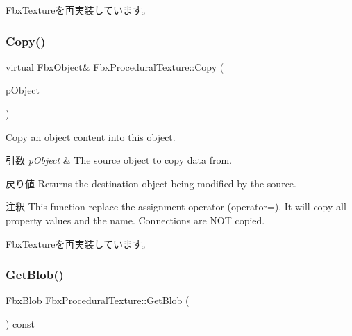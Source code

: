 \hyperlink{class_fbx_texture_a851d5c4c96fb5023c004c88aeab2275b}{Fbx\+Texture}を再実装しています。

\mbox{\label{class_fbx_procedural_texture_aab5e11d2e578c958cbe97f999379eeb4}} 
\subsubsection{\texorpdfstring{Copy()}{Copy()}}
{\footnotesize\ttfamily virtual \hyperlink{class_fbx_object}{Fbx\+Object}\& Fbx\+Procedural\+Texture\+::\+Copy (\begin{DoxyParamCaption}\item[{const \hyperlink{class_fbx_object}{Fbx\+Object} \&}]{p\+Object }\end{DoxyParamCaption})\hspace{0.3cm}{\ttfamily [virtual]}}

Copy an object content into this object. 
\begin{DoxyParams}{引数}
{\em p\+Object} & The source object to copy data from. \\
\hline
\end{DoxyParams}
\begin{DoxyReturn}{戻り値}
Returns the destination object being modified by the source. 
\end{DoxyReturn}
\begin{DoxyRemark}{注釈}
This function replace the assignment operator (operator=). It will copy all property values and the name. Connections are N\+OT copied. 
\end{DoxyRemark}


\hyperlink{class_fbx_texture_a321c23c2dc2e91c58e2fcc2ed7d29f9e}{Fbx\+Texture}を再実装しています。

\mbox{\label{class_fbx_procedural_texture_a89d29f48ef80fa46c0ebb3ade036952a}} 
\subsubsection{\texorpdfstring{Get\+Blob()}{GetBlob()}}
{\footnotesize\ttfamily \hyperlink{class_fbx_blob}{Fbx\+Blob} Fbx\+Procedural\+Texture\+::\+Get\+Blob (\begin{DoxyParamCaption}{ }\end{DoxyParamCaption}) const}

